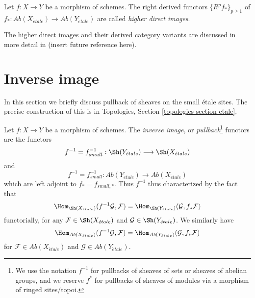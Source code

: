 \begin{definition}
\label{definition-higher-direct-images}
Let $f: X \to Y$ be a morphism of schemes.
The right derived functors $\{R^pf_*\}_{p \geq 1}$ of
$f_* : \textit{Ab}(X_{\acute{e}tale}) \to \textit{Ab}(Y_{\acute{e}tale})$
are called {\it higher direct images}.
\end{definition}

\noindent
The higher direct images and their derived category variants are
discussed in more detail in (insert future reference here).



\section{Inverse image}
\label{section-inverse-image}

\noindent
In this section we briefly discuss pullback of sheaves on the small
\'etale sites. The precise construction of this is in
Topologies, Section \ref{topologies-section-etale}.

\begin{definition}
\label{definition-inverse-image}
Let $f: X\to Y$ be a morphism of schemes. The {\it inverse image}, or
{\it pullback}\footnote{We use the notation $f^{-1}$ for pullbacks of
sheaves of sets or sheaves of abelian groups, and we reserve $f^*$ for
pullbacks of sheaves of modules via a morphism of ringed sites/topoi.}
functors are the functors
$$
f^{-1} = f_{small}^{-1} :
\Sh(Y_{\acute{e}tale})
\longrightarrow
\Sh(X_{\acute{e}tale})
$$
and
$$
f^{-1} = f_{small}^{-1} :
\textit{Ab}(Y_{\acute{e}tale})
\longrightarrow
\textit{Ab}(X_{\acute{e}tale})
$$
which are left adjoint to $f_* = f_{small, *}$. Thus
$f^{-1}$ thus characterized by the fact that
$$
\Hom_{{\Sh(X_{\acute{e}tale})}} (f^{-1}\mathcal{G}, \mathcal{F})
=
\Hom_{\Sh(Y_{\acute{e}tale})} (\mathcal{G}, f_*\mathcal{F})
$$
functorially, for any $\mathcal{F} \in \Sh(X_{\acute{e}tale})$ and
$\mathcal{G} \in \Sh(Y_{\acute{e}tale})$. We similarly have
$$
\Hom_{{\textit{Ab}(X_{\acute{e}tale})}} (f^{-1}\mathcal{G}, \mathcal{F})
=
\Hom_{\textit{Ab}(Y_{\acute{e}tale})} (\mathcal{G}, f_*\mathcal{F})
$$
for $\mathcal{F} \in \textit{Ab}(X_{\acute{e}tale})$ and
$\mathcal{G} \in \textit{Ab}(Y_{\acute{e}tale})$.
\end{definition}

